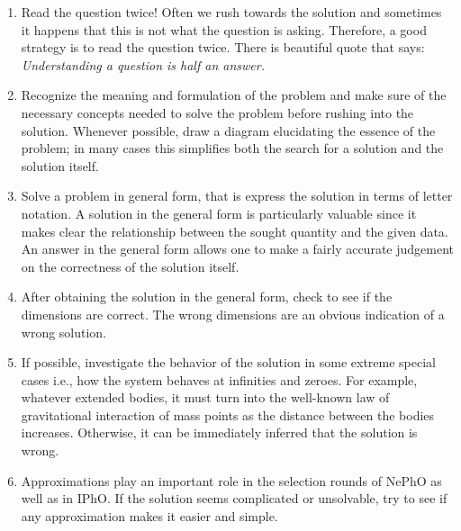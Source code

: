 \begin{enumerate}

    \item Read the question twice! Often we rush towards the solution and sometimes it happens that this is not what the question is asking. Therefore, a good strategy is to read the question twice. There is beautiful quote that says: \textit{Understanding a question is half an answer.}    
    
    \item Recognize the meaning and formulation of the problem and make sure of the necessary concepts needed to solve the problem before rushing into the solution. Whenever possible, draw a diagram elucidating the essence of the problem; in many cases this simplifies both the search for a solution and the solution itself.  
    
    \item Solve a problem in general form, that is express the solution in terms of letter notation. A solution in the general form is particularly valuable since it makes clear the relationship between the sought quantity and the given data. An answer in the general form allows one to make a fairly accurate judgement on the correctness of the solution itself.   

   \item After obtaining the solution in the general form, check to see if the dimensions are correct. The wrong dimensions are an obvious indication of a wrong solution. 
   
   \item If possible, investigate the behavior of the solution in some extreme special cases i.e., how the system behaves at infinities and zeroes. For example, whatever extended bodies, it must turn into the well-known law of gravitational interaction of mass points as the distance between the bodies increases. Otherwise, it can be immediately inferred that the solution is wrong.
   
   \item Approximations play an important role in the selection rounds of NePhO as well as in IPhO. If the solution seems complicated or unsolvable, try to see if any approximation makes it easier and simple.   
\end{enumerate}
